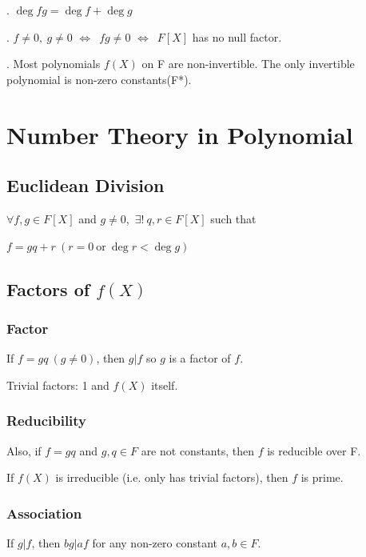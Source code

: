 \documentclass{article}
\begin{document}
\vspace{0.2cm}
. $\deg fg = \deg f + \deg g$

\vspace{0.2cm}
. $f \neq 0,\ g \neq 0$ $\Leftrightarrow$\ $fg \neq 0$ $\Leftrightarrow$\ $F[X]$ has no null factor.

\vspace{0.2cm}
. Most polynomials $f(X)$ on F are non-invertible. The only invertible polynomial is non-zero constants(F*).

\section{Number Theory in Polynomial}
\subsection{Euclidean Division}
$\forall f, g \in F[X]$ and $g \neq 0$,\  $\exists ! \ q, r \in F[X]$ such that

\begin{center}
$f = gq + r\ (r = 0\  \text{or}\  \deg r < \deg g)$
\end{center}

\subsection{Factors of $f(X)$}
\subsubsection{Factor}
If $f = gq\ (g \neq 0)$, then $g|f$ so $g$ is a factor of $f$.\ 

\vspace{0.2cm}
\noindent
Trivial factors: 1 and $f(X)$ itself.

\subsubsection{Reducibility}
\noindent
Also, if $f = gq$ and $g,q\in F$ are not constants, then $f$ is reducible over F.

\vspace{0.2cm}
\noindent
If $f(X)$ is irreducible (i.e. only has trivial factors), then $f$ is prime.

\subsubsection{Association}
\noindent
If $g|f$, then $bg|af$ for any non-zero constant $a,b \in F$.
\end{document}

